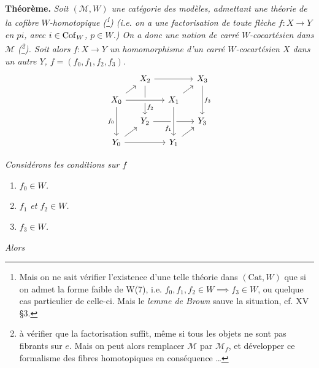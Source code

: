 \setcounter{footnote}{136}
\textbf{Théorème.} \textit{Soit $(\mathcal{M}, W)$ une catégorie des modèles, admettant une théorie de la cofibre $W$-homotopique \textup{(}\footnote{Mais on ne sait vérifier l'existence d'une telle théorie dans $(\mathrm{Cat}, W)$ que si on admet la forme faible de W(7), i.e. $f_0, f_1, f_2 \in W \implies f_3 \in W$, ou quelque cas particulier de celle-ci. Mais le \textit{lemme de Brown} sauve la situation, cf. XV \S3.}\textup{)} (i.e. on a une factorisation de toute flèche $f : X \longrightarrow Y$ en $pi$, avec $i \in \mathrm{Cof}_W$, $p \in W$.) On a donc une notion de carré $W$-cocartésien dans $\mathcal{M}$ \textup{(}\footnote{à vérifier que la factorisation suffit, même si tous les objets ne sont pas fibrants sur $e$. Mais on peut alors remplacer $\mathcal{M}$ par $\mathcal{M}_f$, et développer ce formalisme des fibres homotopiques en conséquence \dots}\textup{)}. Soit
alors $f : X \longrightarrow Y$ un homomorphisme d'un carré $W$-cocartésien $X$ dans un autre $Y$, $f = (f_0, f_1, f_2, f_3)$.}
\[
\begin{tikzcd}[ampersand replacement=\&, column sep=small, row sep=small]
 \& X_2 \arrow[rr] \arrow[dd, "f_2" near end] \& \& X_3 \arrow[dd, "f_3"] \\
X_0 \arrow[ur] \arrow[rr, crossing over] \arrow[dd, "f_0"'] \& \& X_1 \arrow[ur] \& \\
 \& Y_2 \arrow[rr] \& \& Y_3 \\
Y_0 \arrow[ur] \arrow[rr] \& \& Y_1 \arrow[ur] \arrow[from=uu, crossing over, "f_1"' near end] \&
\end{tikzcd}
\]

\textit{Considérons les conditions sur $f$}

\begin{enumerate}
\item[\textit{a)}] \textit{$f_0 \in W$.}
\item[\textit{b)}] \textit{$f_1$ et $f_2 \in W$.}
\item[\textit{c)}] \textit{$f_3 \in W$.}
\end{enumerate}

\textit{Alors}

